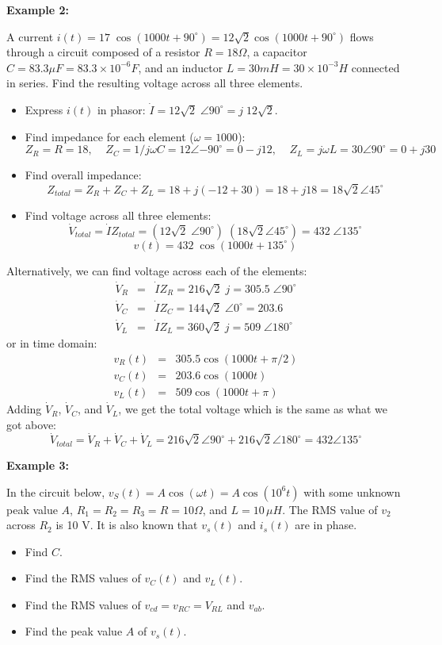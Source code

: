 
{\bf Example 2:} 

A current $i(t)=17\;\cos(1000t+90^\circ)=12\sqrt{2}\cos(1000t+90^\circ)$ 
flows through a circuit composed of a resistor $R=18\Omega$, a capacitor
$C=83.3\mu F=83.3\times 10^{-6}F$, and an inductor $L=30 mH=30\times 
10^{-3}H$ connected in series. Find the resulting voltage across all 
three elements.

\begin{itemize}
\item Express $i(t)$ in phasor: $\dot{I}=12\sqrt{2}\;\angle{90^\circ}
  =j\;12\sqrt{2}$.
\item Find impedance for each element ($\omega=1000$):
  \[
  Z_R=R=18,\;\;\;\;Z_C=1/j\omega C=12\angle{-90^\circ}=0-j12,\;\;\;\;
  Z_L=j\omega L=30\angle{90^\circ}=0+j30	
  \]
\item Find overall impedance:
  \[ 
  Z_{total}=Z_R+Z_C+Z_L=18+j(-12+30)=18+j18=18\sqrt{2}\angle{45^\circ} 
  \]
\item Find voltage across all three elements:
  \[
  \dot{V}_{total}=\dot{I}Z_{total}=(12\sqrt{2}\;\angle{90^\circ})\;(18\sqrt{2}\angle{45^\circ})
  =432\;\angle{135^\circ}	
  \]
  \[
  v(t)=432\;\cos(1000t+135^\circ)
  \]
\end{itemize}
Alternatively, we can find voltage across each of the elements:
\begin{eqnarray}
  \dot{V}_R&=&\dot{I}Z_R=216\sqrt{2}\;j=305.5\;\angle{90^\circ}
  \nonumber\\
  \dot{V}_C&=&\dot{I}Z_C=144\sqrt{2}\;\angle{0^\circ}=203.6
  \nonumber\\
  \dot{V}_L&=&\dot{I}Z_L=360\sqrt{2}\;j=509\;\angle{180^\circ}
  \nonumber
\end{eqnarray}
or in time domain:
\begin{eqnarray}
  v_R(t)&=&305.5 \cos(1000t+\pi/2)
  \nonumber\\
  v_C(t)&=&203.6 \cos(1000t)
  \nonumber\\
  v_L(t)&=&509 \cos(1000t+\pi) 
  \nonumber
\end{eqnarray}
Adding $\dot{V}_R$, $\dot{V}_C$, and $\dot{V}_L$, we get the total voltage
which is the same as what we got above:
\[ 
\dot{V}_{total}=\dot{V}_R+\dot{V}_C+\dot{V}_L
=216\sqrt{2}\angle{90^\circ}+216\sqrt{2}\angle{180^\circ}=432 \angle{135^\circ}	
\]

{\bf Example 3:} 

In the circuit below, $v_S(t)=A\cos(\omega t)=A\cos(10^6 t)$
with some unknown peak value $A$, $R_1=R_2=R_3=R=10\Omega$, and 
$L=10\,\mu H$. The RMS value of $v_2$ across $R_2$ is 10 V. It 
is also known that $v_s(t)$ and $i_s(t)$ are in phase. 
\begin{itemize}
\item Find $C$.
\item Find the RMS values of $v_C(t)$ and $v_L(t)$.
\item Find the RMS values of $v_{cd}=v_{RC}=V_{RL}$ and $v_{ab}$.
\item Find the peak value $A$ of $v_s(t)$.
\end{itemize}

